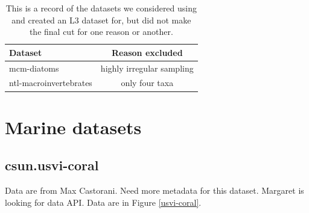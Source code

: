 \documentclass[11pt, oneside]{article}
\begin{document}
\begin{table}[h!]
\scriptsize
   \centering
     \caption{This is a record of the datasets we considered using and created an L3 dataset for, but did not make the final cut for one reason or another.} 
   \begin{tabular}{lc} 
\\
\hline 
\hline
Dataset &Reason excluded\\
\hline
mcm-diatoms & highly irregular sampling\\
ntl-macroinvertebrates & only four taxa\\
   \end{tabular}

   \label{not_used} 
\end{table}


\section {Marine datasets}


\subsection {csun.usvi-coral}
Data are from Max Castorani.
Need more metadata for this dataset.
Margaret is looking for data API.
Data are in Figure \ref{usvi-coral}.
\end{document}
